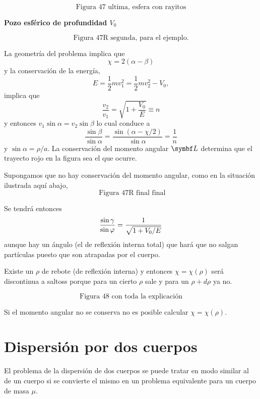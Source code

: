 \documentclass[10pt,oneside]{CBFT_book}
\begin{document}
\[
	\mbox{ Figura 47 ultima, esfera con rayitos }
\]


\begin{ejemplo}{\bf Pozo esférico de profundidad $V_0$}
 
\[
	\mbox{ Figura 47R segunda, para el ejemplo. }
\] 
 
La geometría del problema implica que 
\[
	\chi = 2(\alpha - \beta)
\]
y la conservación de la energía,
\[
	E = \frac 1 2 m v_1^2 = \frac 1 2 m v_2^2 - V_0,
\]
implica que 
\[
	\frac {v_2} {v_1} = \sqrt{ 1 + \frac{V_0}{E}} \equiv n
\]
y entonces $ v_1 \sin \alpha = v_2 \sin \beta$ lo cual conduce a  
\[
	\frac{\sin \beta}{\sin \alpha} = \frac{\sin (\alpha - \chi/2 )}{\sin \alpha} = \frac 1 n
\]
y $\sin \alpha = \rho / a$.
La conservación del momento angular $\vb{L}$ determina que el trayecto rojo en la figura sea 
el que ocurre.

Supongamos que no hay conservación del momento angular, como en la situación ilustrada aquí abajo,
\[
	\mbox{ Figura 47R final final}
\]

Se tendrá entonces
\[
	\frac{\sin \gamma}{\sin \varphi} = \frac{1}{\sqrt{ 1 + V_0/E }}
\]
aunque hay un ángulo (el de reflexión interna total) que hará que no salgan partículas puesto que 
son atrapadas por el cuerpo.

Existe un $\rho$ de rebote (de reflexión interna) y entonces $\chi=\chi(\rho)$ será discontinua a 
saltoss porque para un cierto $\rho$ sale y para un $\rho + d\rho$ ya no.

\[
	\mbox{ Figura 48 con toda la explicación }
\]

Si el momento angular no se conserva no es posible calcular $\chi = \chi(\rho) $.
\end{ejemplo}


\section{Dispersión por dos cuerpos}

El problema de la dispersión de dos cuerpos se puede tratar en modo similar al de un cuerpo si se
convierte el mismo en un problema equivalente para un cuerpo de masa $\mu$.
\end{document}
